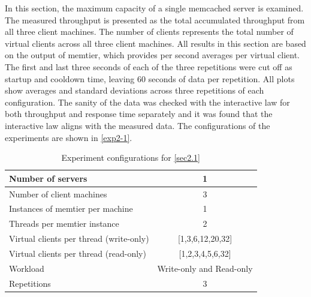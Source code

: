 \documentclass[11pt,a4paper]{article}
\begin{document}
In this section, the maximum capacity of a single memcached server is examined. The measured throughput is presented as the total accumulated throughput from all three client machines. The number of clients represents the total number of virtual clients across all three client machines. All results in this section are based on the output of memtier, which provides per second averages per virtual client. The first and last three seconds of each of the three repetitions were cut off as startup and cooldown time, leaving 60 seconds of data per repetition. All plots show averages and standard deviations across three repetitions of each configuration. The sanity of the data was checked with the interactive law for both throughput and response time separately and it was found that the interactive law aligns with the measured data. The configurations of the experiments are shown in \autoref{exp2-1}.

\begin{table}[H]
    \centering
	\begin{tabular}{|l|c|}
		\hline Number of servers                        & 1                                 \\ 
		\hline Number of client machines                & 3                                 \\ 
		\hline Instances of memtier per machine         & 1                                 \\ 
		\hline Threads per memtier instance             & 2                                 \\
		\hline Virtual clients per thread (write-only)  & [1,3,6,12,20,32]                  \\ 
		\hline Virtual clients per thread (read-only)   & [1,2,3,4,5,6,32]                  \\ 
		\hline Workload                                 & Write-only and Read-only          \\
		\hline Repetitions                              & 3                                 \\ 
		\hline 
	\end{tabular}
	\caption{Experiment configurations for \autoref{sec2.1}} \label{exp2-1}
\end{table}
\end{document}
